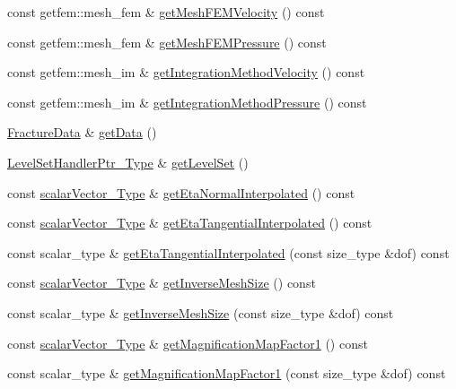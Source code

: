 \begin{DoxyCompactItemize}
const getfem\-::mesh\-\_\-fem \& \hyperlink{classFractureHandler_ae54c07023428b44556bbec4da5be9306}{get\-Mesh\-F\-E\-M\-Velocity} () const 
\item 
const getfem\-::mesh\-\_\-fem \& \hyperlink{classFractureHandler_a6dc20a9624f9dff49b1c58f0dd261002}{get\-Mesh\-F\-E\-M\-Pressure} () const 
\item 
const getfem\-::mesh\-\_\-im \& \hyperlink{classFractureHandler_afe4c174c17862ed30b99ebe4a80aa695}{get\-Integration\-Method\-Velocity} () const 
\item 
const getfem\-::mesh\-\_\-im \& \hyperlink{classFractureHandler_ad7afd53439c3067f46a0fb6e1473d661}{get\-Integration\-Method\-Pressure} () const 
\item 
\hyperlink{classFractureData}{Fracture\-Data} \& \hyperlink{classFractureHandler_a68ed77a8d9816a472700ee4bcf2f505d}{get\-Data} ()
\item 
\hyperlink{LevelSetHandler_8h_aba343569cb3213c103252f69c39cad0b}{Level\-Set\-Handler\-Ptr\-\_\-\-Type} \& \hyperlink{classFractureHandler_af37ab12a17f812a960da2aa71699ba0f}{get\-Level\-Set} ()
\item 
const \hyperlink{Core_8h_a4e75b5863535ba1dd79942de2846eff0}{scalar\-Vector\-\_\-\-Type} \& \hyperlink{classFractureHandler_ac5cab221c35c03c72b264d73564d5e38}{get\-Eta\-Normal\-Interpolated} () const 
\item 
const \hyperlink{Core_8h_a4e75b5863535ba1dd79942de2846eff0}{scalar\-Vector\-\_\-\-Type} \& \hyperlink{classFractureHandler_a06b6f81d62ccd91ec1253cd41ffae808}{get\-Eta\-Tangential\-Interpolated} () const 
\item 
const scalar\-\_\-type \& \hyperlink{classFractureHandler_a47c7f4161817ebf6cd978cf6b2caa74f}{get\-Eta\-Tangential\-Interpolated} (const size\-\_\-type \&dof) const 
\item 
const \hyperlink{Core_8h_a4e75b5863535ba1dd79942de2846eff0}{scalar\-Vector\-\_\-\-Type} \& \hyperlink{classFractureHandler_a3f78aef488ef82ac8384bdd9e39a9be5}{get\-Inverse\-Mesh\-Size} () const 
\item 
const scalar\-\_\-type \& \hyperlink{classFractureHandler_a1e1ba24caa1e789b199252c3c34f696d}{get\-Inverse\-Mesh\-Size} (const size\-\_\-type \&dof) const 
\item 
const \hyperlink{Core_8h_a4e75b5863535ba1dd79942de2846eff0}{scalar\-Vector\-\_\-\-Type} \& \hyperlink{classFractureHandler_abaf5f99ba68775a587d6b3f0222e8b9a}{get\-Magnification\-Map\-Factor1} () const 
\item 
const scalar\-\_\-type \& \hyperlink{classFractureHandler_a1cafea5a92ab3a9b5eae67c347867f58}{get\-Magnification\-Map\-Factor1} (const size\-\_\-type \&dof) const 

\end{DoxyCompactItemize}
